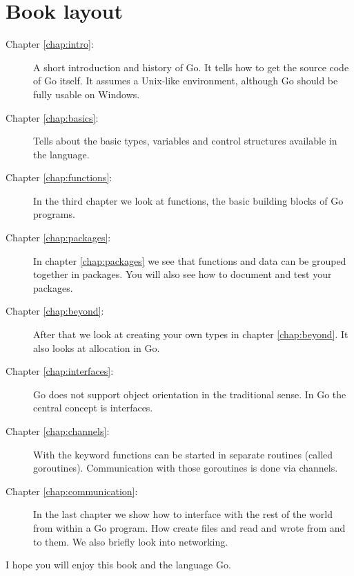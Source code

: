 \section*{Book layout}
\begin{description}
\item[Chapter \ref{chap:intro}: ]
A short introduction and history of Go. It
tells how to get the source code of Go itself. It assumes a Unix-like environment, although
Go should be fully usable on Windows.

\item[Chapter \ref{chap:basics}: ] 
Tells about the basic types, variables and control
structures available in the language.

\item[Chapter \ref{chap:functions}: ] 
In the third chapter we look at functions, the basic building blocks of Go programs.

\item[Chapter \ref{chap:packages}: ] 
In chapter \ref{chap:packages} we see that functions and data can be grouped together
in packages. You will also see how to document and test your packages.

\item[Chapter \ref{chap:beyond}: ] 
After that we look at creating your own types in chapter \ref{chap:beyond}. It also
looks at allocation in Go.

\item[Chapter \ref{chap:interfaces}: ] 
Go does not support object orientation in the traditional sense.
In Go the central concept is interfaces.

\item[Chapter \ref{chap:channels}: ] 
With the  keyword functions can be started in separate routines (called goroutines). 
Communication with those goroutines is done via channels. 

\item[Chapter \ref{chap:communication}: ] 
In the last chapter we show how to interface with the rest of the world from within 
a Go program. How create files and read and wrote from and to them. We also briefly
look into networking.
\end{description}

I hope you will enjoy this book and the language Go.

